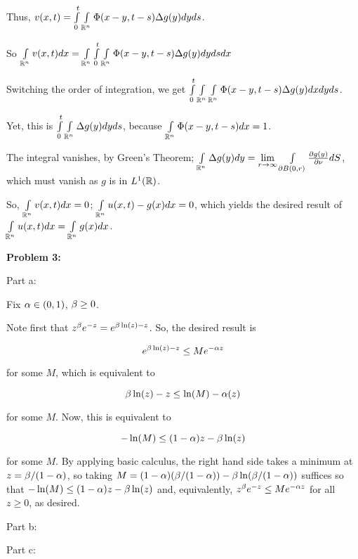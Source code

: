 \documentclass[a4paper,12pt]{article}
\begin{document}
Thus, $v(x,t) = \int\limits_0^t \int\limits_{\mathbb{R}^n} \Phi(x-y,t-s) \Delta g(y) dy ds$.

So $\int\limits_{\mathbb{R}^n} v(x,t) dx = \int\limits_{\mathbb{R}^n} \int\limits_0^t \int\limits_{\mathbb{R}^n} \Phi(x-y,t-s) \Delta g(y) dy ds dx$

Switching the order of integration, we get $ \int\limits_0^t \int\limits_{\mathbb{R}^n} \int\limits_{\mathbb{R}^n} \Phi(x-y,t-s) \Delta g(y) dx dy ds$.

Yet, this is $ \int\limits_0^t \int\limits_{\mathbb{R}^n} \Delta g(y) dy ds$, because $\int\limits_{\mathbb{R}^n} \Phi(x-y,t-s) dx = 1$. 

The integral vanishes, by Green's Theorem; $\int\limits_{\mathbb{R}^n} \Delta g(y) dy = \lim\limits_{r \to \infty} \int\limits_{\partial B(0,r)} \frac{\partial g(y)}{\partial \nu} dS$, which must vanish as $g$ is in $L^1(\mathbb{R})$. %

So, $\int\limits_{\mathbb{R}^n} v(x,t) dx = 0$; $\int\limits_{\mathbb{R}^n} u(x,t) - g(x) dx = 0$, which yields the desired result of $\int\limits_{\mathbb{R}^n} u(x,t) dx = \int\limits_{\mathbb{R}^n} g(x) dx$.

\shunt

{\bf Problem 3:}

Part a: %

Fix $\alpha \in (0,1)$, $\beta \geq 0$.

Note first that $z^\beta e^{-z} = e^{\beta \ln(z) - z}$. So, the desired result is

\begin{displaymath}
e^{\beta \ln(z) - z} \leq M e^{-\alpha z}
\end{displaymath}

for some $M$, which is equivalent to

\begin{displaymath}
\beta \ln(z) - z \leq \ln(M) - \alpha(z)
\end{displaymath}

for some $M$. Now, this is equivalent to 

\begin{displaymath}
- \ln(M) \leq (1-\alpha)z - \beta \ln(z)
\end{displaymath}

for some $M$. By applying basic calculus, the right hand side takes a minimum at $z = \beta / (1-\alpha)$, so taking $M = (1-\alpha)(\beta / (1-\alpha)) - \beta \ln(\beta / (1-\alpha))$ suffices so that $-\ln(M) \leq (1-\alpha)z - \beta \ln(z)$ and, equivalently, $z^\beta e^{-z} \leq Me^{-\alpha z}$ for all $z \geq 0$, as desired.

\shunt

Part b:

\shunt

Part c:

\shunt
\end{document}
